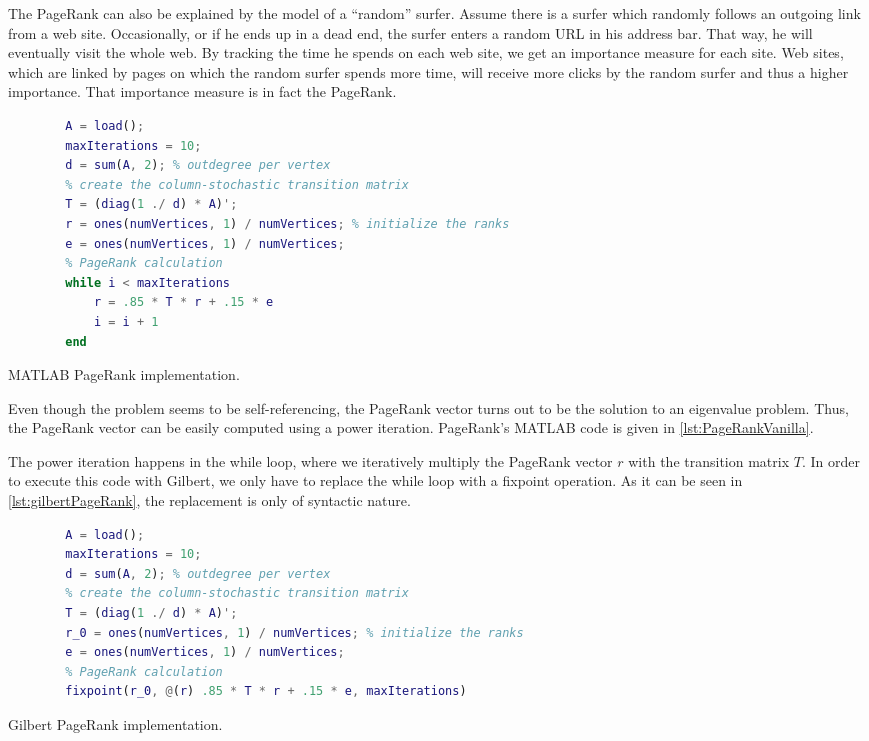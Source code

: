 The PageRank can also be explained by the model of a ``random'' surfer.
Assume there is a surfer which randomly follows an outgoing link from a web site.
Occasionally, or if he ends up in a dead end, the surfer enters a random URL in his address bar.
That way, he will eventually visit the whole web.
By tracking the time he spends on each web site, we get an importance measure for each site.
Web sites, which are linked by pages on which the random surfer spends more time, will receive more clicks by the random surfer and thus a higher importance.
That importance measure is in fact the PageRank.

\begin{listing}[!h]
	\begin{CenteredBox}
		\begin{lstlisting}[language=Matlab]
		% load adjacency matrix
		A = load(); 
		maxIterations = 10;
		d = sum(A, 2); % outdegree per vertex
		% create the column-stochastic transition matrix
		T = (diag(1 ./ d) * A)'; 
		r = ones(numVertices, 1) / numVertices; % initialize the ranks
		e = ones(numVertices, 1) / numVertices;
		% PageRank calculation
		while i < maxIterations
			r = .85 * T * r + .15 * e
			i = i + 1
		end
		\end{lstlisting}
	\end{CenteredBox}
	\caption{MATLAB PageRank implementation.}
	\label{lst:PageRankVanilla}
\end{listing}

Even though the problem seems to be self-referencing, the PageRank vector turns out to be the solution to an eigenvalue problem.
Thus, the PageRank vector can be easily computed using a power iteration.
PageRank's MATLAB code is given in \cref{lst:PageRankVanilla}.

The power iteration happens in the while loop, where we iteratively multiply the PageRank vector $r$ with the transition matrix $T$.
In order to execute this code with Gilbert, we only have to replace the while loop with a fixpoint operation.
As it can be seen in \cref{lst:gilbertPageRank}, the replacement is only of syntactic nature.

\begin{listing}[!h]
	\begin{CenteredBox}
		\begin{lstlisting}[language=Matlab]
		% load adjacency matrix
		A = load();
		maxIterations = 10;
		d = sum(A, 2); % outdegree per vertex
		% create the column-stochastic transition matrix
		T = (diag(1 ./ d) * A)'; 
		r_0 = ones(numVertices, 1) / numVertices; % initialize the ranks
		e = ones(numVertices, 1) / numVertices;
		% PageRank calculation
		fixpoint(r_0, @(r) .85 * T * r + .15 * e, maxIterations)
		\end{lstlisting}
	\end{CenteredBox}
	\caption{Gilbert PageRank implementation.}
	\label{lst:gilbertPageRank}
\end{listing}

